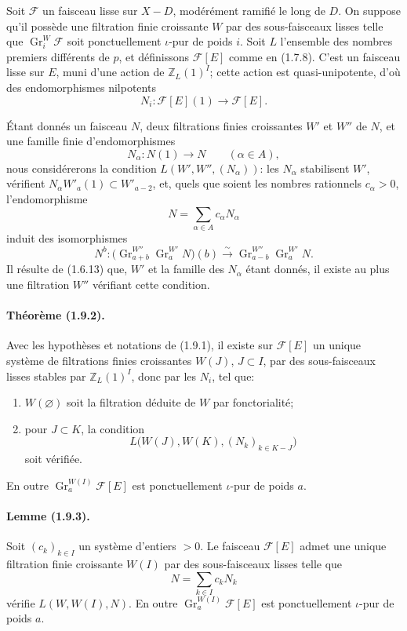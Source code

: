 \documentclass[11pt]{article}
\theoremstyle{remark}
\newcommand{\ZZ}{\mathbb{Z}}
\newcommand{\Gr}{\operatorname{Gr}}
\begin{document}
Soit \(\mathcal F\) un faisceau lisse sur \(X-D\), modérément ramifié le long de \(D\). On suppose qu'il possède une filtration finie croissante \(W\) par des sous-faisceaux lisses telle que \(\Gr^W_i\mathcal F\) soit ponctuellement \(\iota\)-pur de poids \(i\). Soit \(L\) l'ensemble des nombres premiers différents de \(p\), et définissons \(\mathcal F[E]\) comme en (1.7.8). C'est un faisceau lisse sur \(E\), muni d'une action de \(\ZZ_L(1)^I\); cette action est quasi-unipotente, d'où des endomorphismes nilpotents
\[
N_i:\mathcal F[E](1)\longrightarrow \mathcal F[E].
\]

Étant donnés un faisceau \(N\), deux filtrations finies croissantes \(W'\) et \(W''\) de \(N\), et une famille finie d'endomorphismes
\[
N_\alpha:N(1)\longrightarrow N\qquad(\alpha\in A),
\]
nous considérerons la condition \(L(W',W'',(N_\alpha))\): les \(N_\alpha\) stabilisent \(W'\), vérifient \(N_\alpha W'_a(1)\subset W'_{a-2}\), et, quels que soient les nombres rationnels \(c_\alpha>0\), l'endomorphisme
\[
N=\sum_{\alpha\in A}c_\alpha N_\alpha
\]
induit des isomorphismes
\[
N^b:\bigl(\Gr^{W''}_{a+b}\Gr^{W'}_aN\bigr)(b)
 \xrightarrow{\sim}
 \Gr^{W''}_{a-b}\Gr^{W'}_aN .
\]
Il résulte de (1.6.13) que, \(W'\) et la famille des \(N_\alpha\) étant donnés, il existe au plus une filtration \(W''\) vérifiant cette condition.

\paragraph{Théorème (1.9.2).}
Avec les hypothèses et notations de (1.9.1), il existe sur \(\mathcal F[E]\) un unique système de filtrations finies croissantes \(W(J)\), \(J\subset I\), par des sous-faisceaux lisses stables par \(\ZZ_L(1)^I\), donc par les \(N_i\), tel que:
\begin{enumerate}[label=\alph*)]
\item \(W(\varnothing)\) soit la filtration déduite de \(W\) par fonctorialité;
\item pour \(J\subset K\), la condition
\[
L\bigl(W(J),W(K),(N_k)_{k\in K-J}\bigr)
\]
soit vérifiée.
\end{enumerate}
En outre \(\Gr^{W(I)}_a\mathcal F[E]\) est ponctuellement \(\iota\)-pur de poids \(a\).

\paragraph{Lemme (1.9.3).}
Soit \((c_k)_{k\in I}\) un système d'entiers \(>0\). Le faisceau \(\mathcal F[E]\) admet une unique filtration finie croissante \(W(I)\) par des sous-faisceaux lisses telle que
\[
N=\sum_{k\in I}c_kN_k
\]
vérifie \(L(W,W(I),N)\). En outre \(\Gr^{W(I)}_a\mathcal F[E]\) est ponctuellement \(\iota\)-pur de poids \(a\).
\end{document}
